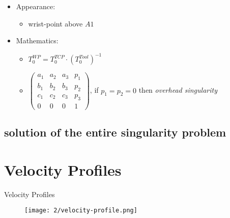\documentclass[%
  professionalfonts,%
  xcolor={%
    usenames,%
    dvipsnames,%
    svgnames,%
    table,%
    hyperref%
  }%
]{beamer}
\begin{document}
\begin{frame}
\begin{itemize}
\item Appearance:
  \begin{itemize}
  \item wrist-point above $A1$
  \end{itemize}
\item Mathematics:
  \begin{itemize}
  \item $T_{0}^{WP} = T_{0}^{TCP} \cdot (T_{0}^{Tool})^{-1}$
  \item           
  $\begin{pmatrix}
  a_1 & a_2 & a_3 & p_1 \\
  b_1 & b_2 & b_3 & p_2 \\
  c_1 & c_2 & c_3 & p_3 \\
  0   & 0   & 0   & 1 
  \end{pmatrix}$, 
  if $p_1 = p_2 = 0$ then \emph{overhead singularity}
  \end{itemize}
\end{itemize}  
\end{frame}

\begin{frame}[fragile]

\end{frame}

\subsection{solution of the entire singularity problem}
\begin{frame}[fragile]

\end{frame}


\section{Velocity Profiles}
\begin{frame}{Velocity Profiles}
\begin{figure}[h]
  \texttt{[image: 2/velocity-profile.png]}
  \label{fig:velocity-profile}
\end{figure}
\end{frame}
\end{document}
